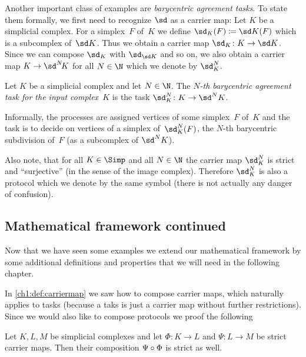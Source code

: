Another important class of examples are \emph{barycentric agreement tasks}. To
state them formally, we first need to recognize $\sd$ as a carrier map:
Let $K$ be a simplicial complex. For a simplex~$F$ of~$K$ we define
$\sd_K(F) \defeq \sd K(F)$ which is a subcomplex of~$\sd K$. Thus we
obtain a carrier map $\sd_K\colon K\to\sd K$. Since we can compose
$\sd_K$ with $\sd_{\sd K}$ and so on, we also obtain a carrier map
$K\to\sd^N\!K$ for all $N\in\N$ which we denote by $\sd_K^N$.

\begin{thExample}
    \label{ch1:barycentricagreement}
    Let $K$ be a simplicial complex and let $N\in\N$. The
    \emph{$N$-th barycentric agreement task for the input complex~$K$}
    is the task $\sd_K^N\colon K\to\sd^N K$.
    
    Informally, the processes are assigned vertices of some simplex~$F$
    of~$K$ and the task is to decide on vertices of a simplex
    of~$\sd_K^N(F)$, the $N$-th barycentric subdivision of~$F$
    (as a subcomplex of $\sd^N K$).
\end{thExample}

Also note, that for all $K\in\Simp$ and all $N\in\N$ the carrier map
$\sd_K^N$ is strict and \enquote{surjective} (in the sense of the image
complex). Therefore $\sd_K^N$ is also a protocol which we denote by
the same symbol (there is not actually any danger of confusion).


\subsection{Mathematical framework continued}
Now that we have seen some examples we extend our mathematical
framework by some additional definitions and properties that we
will need in the following chapter.

In \cref{ch1:def:carriermap} we saw how to compose carrier maps,
which naturally applies to tasks (because a taks is just a carrier
map without further restrictions). Since we would also like to compose
protocols we proof the following

\begin{thLemma}
    Let $K,L,M$ be simplicial complexes and let $\Phi\colon K\to L$
    and $\Psi\colon L\to M$ be strict carrier maps.
    Then their composition $\Psi\after\Phi$ is strict as well.
\end{thLemma}

